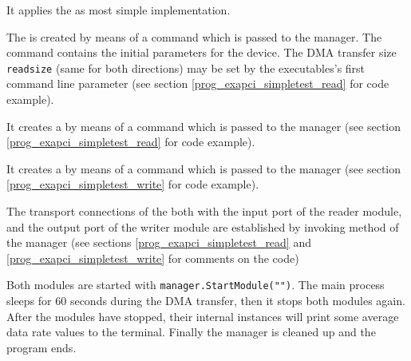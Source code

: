 \begin{compactenum} 

\item It applies the  as most simple
 implementation.

\item The  is created by means of a command
 which is passed to the manager. The 
command contains the initial parameters for the device.
The DMA transfer size {\tt readsize} (same for both directions) 
may be set by the executables's first command line parameter
(see section \ref{prog_exapci_simpletest_read} for code example).

\item It creates a  by means of a command
 which is passed to the manager
(see section \ref{prog_exapci_simpletest_read} for code example).

\item It creates a  by means of a command
 which is passed to the manager
(see section \ref{prog_exapci_simpletest_write} for code example).

\item The transport connections of the  both with
the input port of the reader module, and the output port of the writer module 
are established by invoking method  of the manager
(see sections \ref{prog_exapci_simpletest_read} and \ref{prog_exapci_simpletest_write}
for comments on the code)

\item Both modules are started with
{\tt manager.StartModule("")}.
The main process sleeps for 60 seconds during the DMA transfer, then
it stops both modules again.
After the modules have stopped, their internal 
instances will print some average data rate values to the terminal.
Finally the manager is cleaned up and the program ends.

\end{compactenum} 





